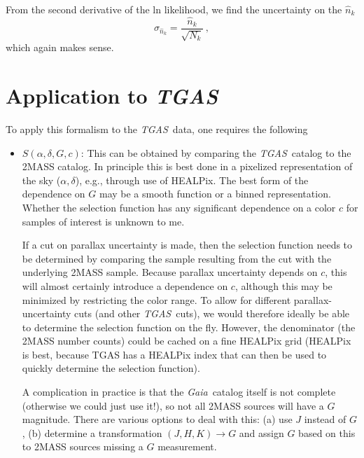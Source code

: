 \documentclass[12pt,preprint]{aastex}
\newcommand{\eg}{e.g.}
\newcommand{\gaia}{\emph{Gaia}}
\newcommand{\tgas}{\emph{TGAS}}
\newcommand{\ra}{\ensuremath{\alpha}}
\newcommand{\dec}{\ensuremath{\delta}}
\begin{document}
From the second derivative of the ln likelihood, we find the
uncertainty on the $\hat{n}_k$
\begin{equation}
  \sigma_{\hat{n}_k} = \frac{\hat{n}_k}{\sqrt{N_k}}\,,
\end{equation}
which again makes sense.

\section{Application to \tgas}

To apply this formalism to the \tgas\ data, one requires the following
\begin{itemize}
  \item $S(\ra,\dec,G,c)$: This can be obtained by comparing the
    \tgas\ catalog to the 2MASS catalog. In principle this is best
    done in a pixelized representation of the sky ($\ra,\dec$), \eg,
    through use of HEALPix. The best form of the dependence on $G$ may
    be a smooth function or a binned representation. Whether the
    selection function has any significant dependence on a color $c$
    for samples of interest is unknown to me.

    If a cut on parallax uncertainty is made, then the selection
    function needs to be determined by comparing the sample resulting
    from the cut with the underlying 2MASS sample. Because parallax
    uncertainty depends on $c$, this will almost certainly introduce a
    dependence on $c$, although this may be minimized by restricting
    the color range. To allow for different parallax-uncertainty cuts
    (and other \tgas\ cuts), we would therefore ideally be able to
    determine the selection function on the fly. However, the
    denominator (the 2MASS number counts) could be cached on a fine
    HEALPix grid (HEALPix is best, because TGAS has a HEALPix index
    that can then be used to quickly determine the selection
    function).

    A complication in practice is that the \gaia\ catalog itself is
    not complete (otherwise we could just use it!), so not all 2MASS
    sources will have a $G$ magnitude. There are various options to
    deal with this: (a) use $J$ instead of $G$, (b) determine a
    transformation $(J,H,K) \rightarrow G$ and assign $G$ based on
    this to 2MASS sources missing a $G$ measurement.


\end{itemize}
\end{document}
